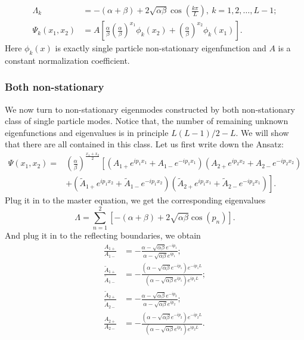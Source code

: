 \begin{subequations}
    \label{eq:eigenTwoMixed}
    \begin{align}
        \Lambda_k & = -(\alpha+\beta) + 2\sqrt{\alpha\beta}\cos(\frac{k\pi}{L}), ~k=1,2,\dots, L-1;  \\
        \Psi_k(x_1, x_2) & =  A\left[ \frac{\alpha}{\beta} \left(\frac{\alpha}{\beta} \right)^{x_1}\phi_k(x_2)+\left(\frac{\alpha}{\beta}\right)^{x_2} \phi_k(x_1) \right].
    \end{align}
\end{subequations}
Here $\phi_k(x)$ is exactly single particle non-stationary eigenfunction and $A$ is a constant normalization coefficient.


\subsubsection{Both non-stationary}
\label{ssub:Both non-stationary}
We now turn to non-stationary eigenmodes constructed by both non-stationary class of single particle modes. Notice that, the number of remaining unknown eigenfunctions and eigenvalues is in principle $L(L-1)/2 - L$. We will show that there are all contained in this class. Let us first write down the Ansatz:
\begin{equation}
    \label{eq:nonstationaryTwoBoth}
    \begin{aligned}
        \Psi(x_1, x_2) = &  \left(\frac{\alpha}{\beta}\right)^{\frac{x_1+x_2}{2}} \left[\left( A_{1+} e^{ip_1 x_1} + A_{1-} e^{-ip_1 x_1}\right)  \left( A_{2+} e^{ip_2 x_2} + A_{2-} e^{-ip_2 x_2}\right) \right.\\
        & \left. + \left( \tilde{A}_{1+} e^{ip_1 x_2} + \tilde{A}_{1-} e^{-ip_1 x_2}\right)  \left( \tilde{A}_{2+} e^{ip_1 x_1} + \tilde{A}_{2-} e^{-ip_2 x_1}\right) \right].
    \end{aligned}
\end{equation}
Plug it in to the master equation, we get the corresponding eigenvalues
\begin{equation}
    \label{eq:eigenvaluesTwoBoth}
    \Lambda = \sum_{n=1}^2\left[-(\alpha+\beta) + 2\sqrt{\alpha\beta}\cos(p_n)\right].
\end{equation} 
And plug it in to the reflecting boundaries, we obtain
\begin{subequations}
    \label{eq:scatterFactorBoundary2}
    \begin{align}
        \frac{A_{1+}}{A_{1-}} & =  -\frac{\alpha-\sqrt{\alpha\beta} e^{-ip_1}}{\alpha-\sqrt{\alpha\beta} e^{ip_1}};  \\
        \frac{\tilde{A}_{1+}}{\tilde{A}_{1-}} & =  -\frac{\left(\alpha-\sqrt{\alpha\beta} e^{-ip_1}\right) e^{-ip_1L}} {\left(\alpha-\sqrt{\alpha\beta} e^{ip_1}\right) e^{ip_1L}}; \\
        \frac{\tilde{A}_{2+}}{\tilde{A}_{2-}} & =  -\frac{\alpha - \sqrt{\alpha\beta} e^{-ip_2}}{\alpha-\sqrt{\alpha\beta} e^{ip_2}};\\
        \frac{A_{2+}}{A_{2-}} & =  -\frac{\left(\alpha-\sqrt{\alpha\beta} e^{-ip_2}\right) e^{-ip_2L}}{\left(\alpha-\sqrt{\alpha\beta} e^{ip_2}\right) e^{ip_2L}}.
    \end{align}
\end{subequations}

